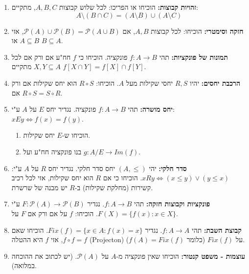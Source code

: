 \documentclass[a4paper,11pt]{article}
\newcommand{\powerset}{\mathcal{P}}
\begin{document}
\begin{enumerate}
    \item \textbf{זהויות קבוצות:}
          הוכיחו או הפריכו: לכל שלוש קבוצות \(A, B, C\), מתקיים:
          \[ A \setminus (B \cap C) = (A \setminus B) \cup (A \setminus C) \]

    \item \textbf{חזקה וסימטרי:}
          הוכיחו: לכל קבוצות \(A, B\), אם \(\powerset(A) \cup \powerset(B) = \powerset(A \cup B)\), אזי \(A \subseteq B\) או \(B \subseteq A\).

    \item \textbf{תמונות של פונקציות:}
          תהי \(f: A \to B\) פונקציה. הוכיחו כי \(f\) חח"ע אם ורק אם לכל \(X, Y \subseteq A\) מתקיים \(f[X \cap Y] = f[X] \cap f[Y]\).

    \item \textbf{הרכבת יחסים:}
          יהיו \(R, S\) יחסי שקילות מעל \(A\). הוכיחו: \(R \circ S\) הוא יחס שקילות אם ורק אם \(R \circ S = S \circ R\).

    \item \textbf{יחס מושרה:}
          תהי \(f: A \to B\) פונקציה. נגדיר יחס \(E\) על \(A\) ע"י: \(xEy \iff f(x)=f(y)\).
          \begin{enumerate}
              \item הוכיחו ש-\(E\) יחס שקילות.
              \item בנו פונקציה חח"ע ועל \(g: A/E \to Im(f)\).
          \end{enumerate}

    \item \textbf{סדר חלקי:}
          יהי \((A, \le)\) יחס סדר חלקי. נגדיר יחס \(R\) על \(A\) ע"י: \(xRy \iff (x \le y) \lor (y \le x)\). הוכיחו כי אם \(R\) הוא יחס שקילות, אזי לכל רכיב קשירות (מחלקת שקילות) ב-\(R\) יש מבנה של שרשרת.

    \item \textbf{פונקציות וקבוצות חזקה:}
          תהי \(f: A \to B\). נגדיר \(F: \powerset(A) \to \powerset(B)\) ע"י \(F(X) = \{f(x) : x \in X\}\).
          הוכיחו: \(f\) על אם ורק אם \(F\) על.

    \item \textbf{קבוצת השבת:}
          תהי \(f: A \to A\). נגדיר \(Fix(f) = \{x \in A : f(x)=x\}\).
          הוכיחו שאם \(f \circ f = f\), אזי \(f\) היא ההטלה (Projecton) על \(Fix(f)\) (כלומר \(f(A) = Fix(f)\)).

    \item \textbf{עוצמות - משפט קנטור:}
          הוכיחו שאין פונקציה מ-\(A\) על \(\powerset(A)\). (יש לכתוב את ההוכחה במלואה).


\end{enumerate}
\end{document}
